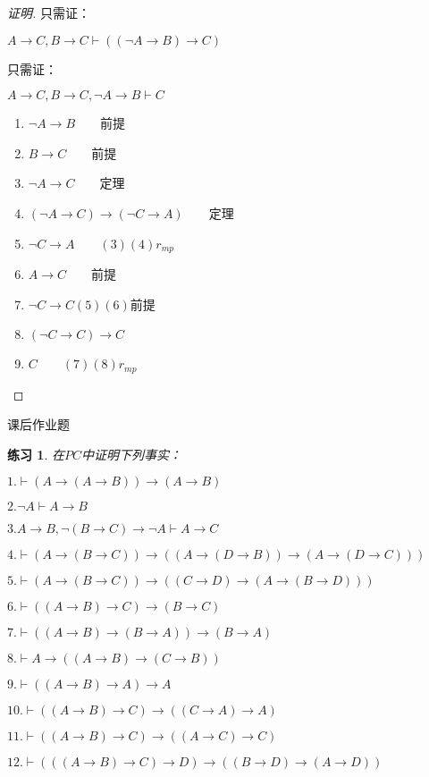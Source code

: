 \documentclass{article}
\newtheorem{Exercise}{练习}
\begin{document}
\begin{CJK*}{UTF8}{gbsn}
\begin{proof}[证明]
只需证：

$A\to C, B\to C\vdash ((\lnot A\to B)\to C)$

只需证：

$A\to C, B\to C, \lnot A\to B\vdash C$

\begin{enumerate}
  \item $\lnot A\to B\qquad$前提
  \item $B\to C\qquad$前提
  \item $\lnot A\to C\qquad$定理
  \item $(\lnot A\to C)\to (\lnot C\to A)\qquad$定理
  \item $\lnot C\to A\qquad(3)(4)r_{mp}$
  \item $A\to C\qquad$前提
  \item $\lnot C\to C(5)(6)$前提
  \item $(\lnot C\to C)\to C$
  \item $C\qquad (7)(8)r_{mp}$
\end{enumerate}
\end{proof}
课后作业题

  \begin{Exercise}
    在$PC$中证明下列事实：
  \end{Exercise}

$1.\vdash (A\to(A\to B))\to (A\to B)$




$2.\lnot A\vdash A\to B$



$3.A\to B, \lnot(B\to C)\to \lnot A\vdash A\to C$



$4.\vdash (A\to (B\to C))\to ((A\to (D\to B))\to (A\to (D\to C)))$



$5.\vdash (A\to (B\to C))\to ((C\to D)\to (A\to (B\to D)))$


$6.\vdash ((A\to B)\to C)\to (B\to C)$


$7.\vdash ((A\to B)\to (B\to A))\to (B\to A)$


$8.\vdash A\to ((A\to B)\to (C\to B))$

$9.\vdash ((A\to B)\to A)\to A$



$10.\vdash ((A\to B)\to C)\to ((C\to A)\to A)$



$11.\vdash ((A\to B)\to C)\to ((A\to C)\to C)$


$12.\vdash (((A\to B)\to C)\to D)\to((B\to D)\to (A\to D))$


\end{CJK*}
\end{document}
